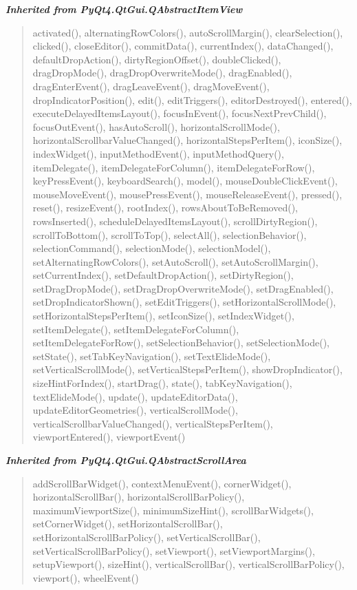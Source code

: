 \large{\textbf{\textit{Inherited from PyQt4.QtGui.QAbstractItemView}}}

\begin{quote}
activated(), alternatingRowColors(), autoScrollMargin(), clearSelection(), clicked(), closeEditor(), commitData(), currentIndex(), dataChanged(), defaultDropAction(), dirtyRegionOffset(), doubleClicked(), dragDropMode(), dragDropOverwriteMode(), dragEnabled(), dragEnterEvent(), dragLeaveEvent(), dragMoveEvent(), dropIndicatorPosition(), edit(), editTriggers(), editorDestroyed(), entered(), executeDelayedItemsLayout(), focusInEvent(), focusNextPrevChild(), focusOutEvent(), hasAutoScroll(), horizontalScrollMode(), horizontalScrollbarValueChanged(), horizontalStepsPerItem(), iconSize(), indexWidget(), inputMethodEvent(), inputMethodQuery(), itemDelegate(), itemDelegateForColumn(), itemDelegateForRow(), keyPressEvent(), keyboardSearch(), model(), mouseDoubleClickEvent(), mouseMoveEvent(), mousePressEvent(), mouseReleaseEvent(), pressed(), reset(), resizeEvent(), rootIndex(), rowsAboutToBeRemoved(), rowsInserted(), scheduleDelayedItemsLayout(), scrollDirtyRegion(), scrollToBottom(), scrollToTop(), selectAll(), selectionBehavior(), selectionCommand(), selectionMode(), selectionModel(), setAlternatingRowColors(), setAutoScroll(), setAutoScrollMargin(), setCurrentIndex(), setDefaultDropAction(), setDirtyRegion(), setDragDropMode(), setDragDropOverwriteMode(), setDragEnabled(), setDropIndicatorShown(), setEditTriggers(), setHorizontalScrollMode(), setHorizontalStepsPerItem(), setIconSize(), setIndexWidget(), setItemDelegate(), setItemDelegateForColumn(), setItemDelegateForRow(), setSelectionBehavior(), setSelectionMode(), setState(), setTabKeyNavigation(), setTextElideMode(), setVerticalScrollMode(), setVerticalStepsPerItem(), showDropIndicator(), sizeHintForIndex(), startDrag(), state(), tabKeyNavigation(), textElideMode(), update(), updateEditorData(), updateEditorGeometries(), verticalScrollMode(), verticalScrollbarValueChanged(), verticalStepsPerItem(), viewportEntered(), viewportEvent()
\end{quote}

\large{\textbf{\textit{Inherited from PyQt4.QtGui.QAbstractScrollArea}}}

\begin{quote}
addScrollBarWidget(), contextMenuEvent(), cornerWidget(), horizontalScrollBar(), horizontalScrollBarPolicy(), maximumViewportSize(), minimumSizeHint(), scrollBarWidgets(), setCornerWidget(), setHorizontalScrollBar(), setHorizontalScrollBarPolicy(), setVerticalScrollBar(), setVerticalScrollBarPolicy(), setViewport(), setViewportMargins(), setupViewport(), sizeHint(), verticalScrollBar(), verticalScrollBarPolicy(), viewport(), wheelEvent()
\end{quote}

